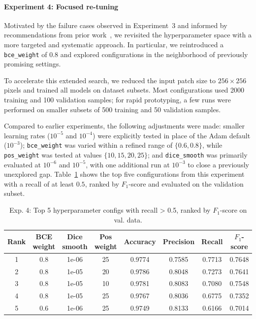 \documentclass[12pt]{article}
\begin{document}
\paragraph{Experiment 4: Focused re-tuning}  
Motivated by the failure cases observed in Experiment~3 and informed by recommendations from prior work~\cite{Moreau.2024}, we revisited the hyperparameter space with a more targeted and systematic approach. In particular, we reintroduced a \texttt{bce\_weight} of $0.8$ and explored configurations in the neighborhood of previously promising settings.

To accelerate this extended search, we reduced the input patch size to $256 \times 256$ pixels and trained all models on dataset subsets. Most configurations used 2000 training and 100 validation samples; for rapid prototyping, a few runs were performed on smaller subsets of 500 training and 50 validation samples.

Compared to earlier experiments, the following adjustments were made: smaller learning rates ($10^{-5}$ and $10^{-4}$) were explicitly tested in place of the Adam default ($10^{-3}$); \texttt{bce\_weight} was varied within a refined range of $\{0.6, 0.8\}$, while \texttt{pos\_weight} was tested at values $\{10, 15, 20, 25\}$; and \texttt{dice\_smooth} was primarily evaluated at $10^{-6}$ and $10^{-5}$, with one additional run at $10^{-3}$ to close a previously unexplored gap. Table~\ref{tab:top5_models_2} shows the top five configurations from this experiment with a recall of at least $0.5$, ranked by $F_1$-score and evaluated on the validation subset.

\begin{table}[t]
    \centering
    \begin{tabular}{c|ccc|cccc}
        \toprule
        Rank & BCE weight & Dice smooth & Pos weight & Accuracy & Precision & Recall & $F_1$-score \\
        \midrule
        1 & 0.8 & 1e-06 & 25 & 0.9774 & 0.7585 & 0.7713 & 0.7648 \\
        2 & 0.8 & 1e-05 & 20 & 0.9786 & 0.8048 & 0.7273 & 0.7641 \\
        3 & 0.8 & 1e-05 & 10 & 0.9781 & 0.8083 & 0.7080 & 0.7548 \\
        4 & 0.8 & 1e-05 & 25 & 0.9767 & 0.8036 & 0.6775 & 0.7352 \\
        5 & 0.6 & 1e-06 & 25 & 0.9749 & 0.8133 & 0.6166 & 0.7014 \\
        \bottomrule
    \end{tabular}
    \caption{Exp. 4: Top 5 hyperparameter configs with recall > 0.5, ranked by $F_1$-score on val. data.}
    \label{tab:top5_models_2}
\end{table}
\end{document}
